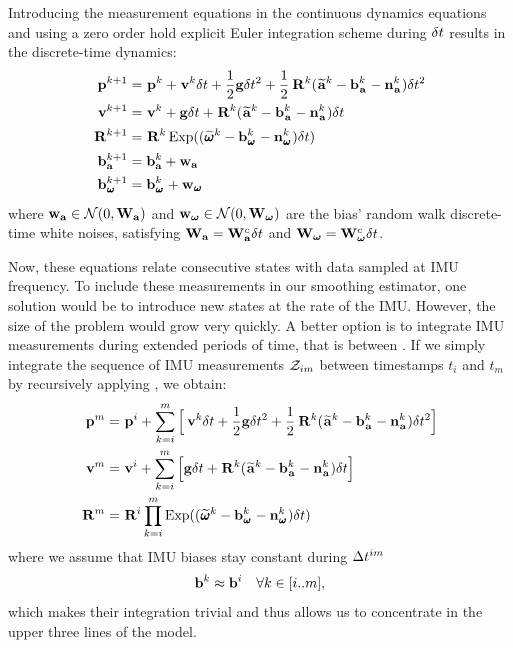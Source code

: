 Introducing the measurement equations  in the continuous dynamics equations  and using a zero order hold
explicit Euler integration scheme during $\delta t$ results in the discrete-time dynamics:
%
\begin{equation}
    \begin{split}
    \prescript{}{}{{\bf p}}_{}^{k+1} &= \prescript{}{}{{\bf p}}_{}^{k} + \prescript{}{}{{\bf v}}_{}^{k}\delta t + \frac{1}{2}{\bf g} \delta t^2 
    + \frac{1}{2}\prescript{}{}{{\bf R}}_{}^{k}(\prescript{}{}{\widetilde{{\bf a}}}_{}^k - {\bf b}_{\prescript{}{}{{\bf a}}_{}}^k - {\bf n}_{\prescript{}{}{{\bf a}}_{}}^k)\delta t^2 \\
    \prescript{}{}{{\bf v}}_{}^{k+1}  &= \prescript{}{}{{\bf v}}_{}^{k} + {\bf g} \delta t + \prescript{}{}{{\bf R}}_{}^{k}(\prescript{}{}{\widetilde{{\bf a}}}_{}^k - {\bf b}_{\prescript{}{}{{\bf a}}_{}}^k - {\bf n}_{\prescript{}{}{{\bf a}}_{}}^k)\delta t
    \\
    \prescript{}{}{{\bf R}}_{}^{k+1}  &= \prescript{}{}{{\bf R}}_{}^{k}\operatorname*{Exp}((\prescript{}{}{\widetilde{\pmb{\omega}}}_{}^k - {\bf b}_{\prescript{}{}{\pmb{\omega}}_{}}^k - {\bf n}_{\prescript{}{}{\pmb{\omega}}_{}}^k)\delta t)
    \\
    {\bf b}_{\bf a}^{k+1} &= {\bf b}_{\bf a}^k + {\bf w}_{\bf a}\\
    {\bf b}_{\prescript{}{}{\pmb{\omega}}_{}}^{k+1} &= {\bf b}_{\prescript{}{}{\pmb{\omega}}_{}}^k + {\bf w}_{\prescript{}{}{\pmb{\omega}}_{}}
    \end{split}
    \label{eq:imu_dyn_disc}
\end{equation}
%
where ${\bf w}_{{\bf a}} \in \mathcal{N}(0,{\bf W}_{\bf a})$ and ${\bf w}_{{{\bm \omega}}} \in \mathcal{N}(0,{\bf W}_{{\bm \omega}})$ are the bias' random walk discrete-time white noises, satisfying ${\bf W}_{\bf a}={\bf W}_{\bf a}^c \delta t$ and ${\bf W}_{{\bm \omega}}={\bf W}_{{\bm \omega}}^c\delta t$.

    
Now, these equations relate consecutive states with data sampled at IMU frequency. To include these measurements in our smoothing estimator,
one solution would be to introduce new states at the rate of the IMU. However, the size of the problem would grow very quickly. A better option
is to integrate IMU measurements during extended periods of time, that is between \keyframes. If we simply integrate the sequence of IMU measurements $\mathcal{Z}_{im}$ between timestamps 
$t_i$ and $t_m$ by recursively applying , we obtain:
%
\begin{equation}
    \begin{split}
    \prescript{}{}{{\bf p}}_{}^{m} &= \prescript{}{}{{\bf p}}_{}^{i} + \sum_{k=i}^{m} \Big[\prescript{}{}{{\bf v}}_{}^{k}\delta t + \frac{1}{2}{\bf g} \delta t^2 
    + \frac{1}{2}\prescript{}{}{{\bf R}}_{}^{k}(\prescript{}{}{\widetilde{{\bf a}}}_{}^k - {\bf b}_{\prescript{}{}{{\bf a}}_{}}^k - {\bf n}_{\prescript{}{}{{\bf a}}_{}}^k)\delta t^2 \Big] \\
    \prescript{}{}{{\bf v}}_{}^{m}  &= \prescript{}{}{{\bf v}}_{}^{i} + \sum_{k=i}^{m} \Big[{\bf g} \delta t + \prescript{}{}{{\bf R}}_{}^{k}(\prescript{}{}{\widetilde{{\bf a}}}_{}^k - {\bf b}_{\prescript{}{}{{\bf a}}_{}}^k - {\bf n}_{\prescript{}{}{{\bf a}}_{}}^k)\delta t \Big]  \\
    \prescript{}{}{{\bf R}}_{}^{m}  &= \prescript{}{}{{\bf R}}_{}^{i} \prod_{k=i}^{m} \operatorname*{Exp}((\prescript{}{}{\widetilde{\pmb{\omega}}}_{}^k - {\bf b}_{\prescript{}{}{\pmb{\omega}}_{}}^k - {\bf n}_{\prescript{}{}{\pmb{\omega}}_{}}^k)\delta t) 
    \end{split}
    \label{eq:IMUIntij}
\end{equation}
%
where we assume that IMU biases stay constant during $\Delta t^{im}$
\begin{equation*}
    {\bf b}^k \approx {\bf b}^i  ~~~ \forall k \in [i..m],
\end{equation*}
%
which makes their integration trivial and thus allows us to concentrate in the upper three lines of the model.




